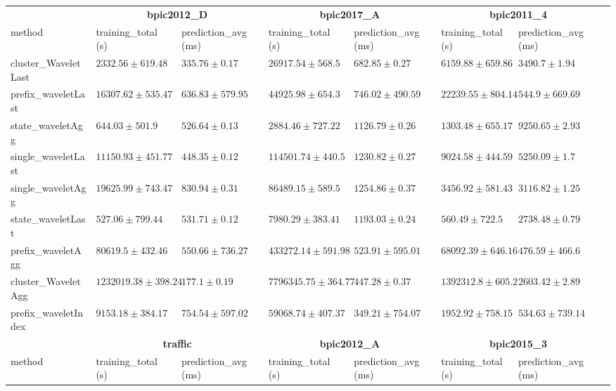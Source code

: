 \documentclass[twoside,11pt]{Latex/Classes/PhDthesisPSnPDF}
\begin{document}
\begin{table}[h]
{\begin{tabular}{llllllll}
				\bottomrule
				\toprule
				& \multicolumn{2}{c}{{\bfseries bpic2012\_D}} & \multicolumn{2}{c}{{\bfseries bpic2017\_A}} & \multicolumn{2}{c}{{\bfseries bpic2011\_4}} \\ \cmidrule(lr){2-3} \cmidrule(lr){4-5} \cmidrule(lr){6-7}
				method  & training\_total (s) & prediction\_avg (ms) & training\_total (s) & prediction\_avg (ms) & training\_total (s) & prediction\_avg (ms) \\ \midrule
				cluster\_WaveletLast & $2332.56 \pm 619.48$ & $335.76 \pm 0.17$ & $26917.54 \pm 568.5$ & $682.85 \pm 0.27$ & $6159.88 \pm 659.86$ & $3490.7 \pm 1.94$ \\ 
				prefix\_waveletLast & $16307.62 \pm 535.47$ & $636.83 \pm 579.95$ & $44925.98 \pm 654.3$ & $746.02 \pm 490.59$ & $22239.55 \pm 804.14$ & $544.9 \pm 669.69$ \\ 
				state\_waveletAgg & $644.03 \pm 501.9$ & $526.64 \pm 0.13$ & $\mathbf{2884.46 \pm 727.22}$ & $1126.79 \pm 0.26$ & $1303.48 \pm 655.17$ & $9250.65 \pm 2.93$ \\ 
				single\_waveletLast & $11150.93 \pm 451.77$ & $448.35 \pm 0.12$ & $114501.74 \pm 440.5$ & $1230.82 \pm 0.27$ & $9024.58 \pm 444.59$ & $5250.09 \pm 1.7$ \\ 
				single\_waveletAgg & $19625.99 \pm 743.47$ & $830.94 \pm 0.31$ & $86489.15 \pm 589.5$ & $1254.86 \pm 0.37$ & $3456.92 \pm 581.43$ & $3116.82 \pm 1.25$ \\ 
				state\_waveletLast & $\mathbf{527.06 \pm 799.44}$ & $531.71 \pm 0.12$ & $7980.29 \pm 383.41$ & $1193.03 \pm 0.24$ & $\mathbf{560.49 \pm 722.5}$ & $2738.48 \pm 0.79$ \\ 
				prefix\_waveletAgg & $80619.5 \pm 432.46$ & $550.66 \pm 736.27$ & $433272.14 \pm 591.98$ & $523.91 \pm 595.01$ & $68092.39 \pm 646.16$ & $\mathbf{476.59 \pm 466.6}$ \\ 
				cluster\_WaveletAgg & $1232019.38 \pm 398.24$ & $\mathbf{177.1 \pm 0.19}$ & $7796345.75 \pm 364.77$ & $447.28 \pm 0.37$ & $1392312.8 \pm 605.2$ & $2603.42 \pm 2.89$ \\ 
				prefix\_waveletIndex & $9153.18 \pm 384.17$ & $754.54 \pm 597.02$ & $59068.74 \pm 407.37$ & $\mathbf{349.21 \pm 754.07}$ & $1952.92 \pm 758.15$ & $534.63 \pm 739.14$ \\ 
				\bottomrule
				\toprule
				& \multicolumn{2}{c}{{\bfseries traffic}} & \multicolumn{2}{c}{{\bfseries bpic2012\_A}} & \multicolumn{2}{c}{{\bfseries bpic2015\_3}} \\ \cmidrule(lr){2-3} \cmidrule(lr){4-5} \cmidrule(lr){6-7}
				method  & training\_total (s) & prediction\_avg (ms) & training\_total (s) & prediction\_avg (ms) & training\_total (s) & prediction\_avg (ms) \\ \midrule

\end{tabular}}
\end{table}
\end{document}

